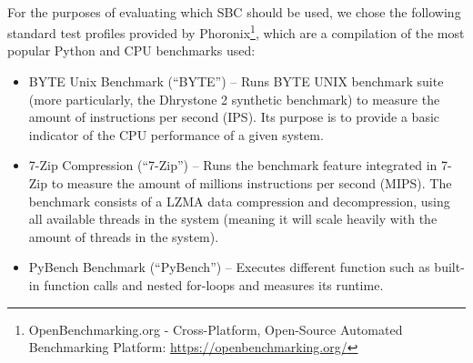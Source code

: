 \paragraph{} For the purposes of evaluating which \acs{SBC} should be used, we chose the following standard test profiles provided by Phoronix\footnote{OpenBenchmarking.org - Cross-Platform, Open-Source Automated Benchmarking Platform: \url{https://openbenchmarking.org/}}, which are a compilation of the most popular Python and CPU benchmarks used:

\begin{itemize}
    \item BYTE Unix Benchmark (``BYTE'') -- Runs BYTE UNIX benchmark suite (more particularly, the Dhrystone 2 synthetic benchmark) to measure the amount of instructions per second (IPS). Its purpose is to provide a basic indicator of the CPU performance of a given system.
    \item 7-Zip Compression (``7-Zip'') -- Runs the benchmark feature integrated in 7-Zip to measure the amount of millions instructions per second (MIPS). The benchmark consists of a LZMA data compression and decompression, using all available threads in the system (meaning it will scale heavily with the amount of threads in the system). 
    \item PyBench Benchmark (``PyBench'') -- Executes different function such as built-in function calls and nested for-loops and measures its runtime.


\end{itemize}
